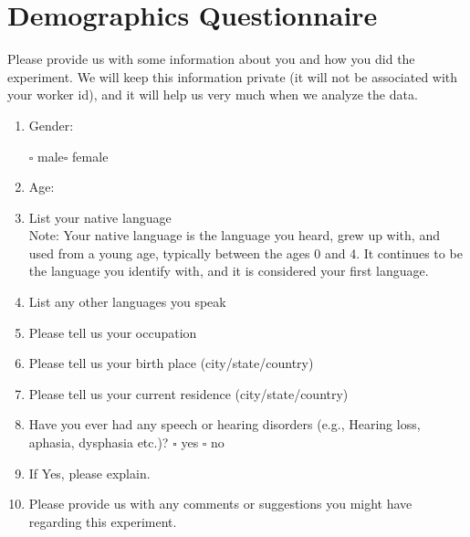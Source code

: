 
\section{Demographics Questionnaire}

Please provide us with some information about you and how you did the experiment. We will keep this information private (it will not be associated with your worker id), and it will help us very much when we analyze the data.
\begin{enumerate}

\item Gender: 

		$\square$ male\quad $\square$ female

\item Age: \underline{\hspace{3cm}}
\item List your native language \underline{\hspace{3cm}}\\
Note: Your native language is the language you heard, grew up with, and used from a young age, typically between the ages 0 and 4. It continues to be the language you identify with, and it is considered your first language. 
\item List any other languages you speak \underline{\hspace{3cm}}
\item Please tell us your occupation \underline{\hspace{3cm}}
\item Please tell us your birth place (city/state/country) \underline{\hspace{3cm}}
\item Please tell us your current residence (city/state/country) \underline{\hspace{3cm}}
\item	Have you ever had any speech or hearing disorders (e.g., Hearing loss, aphasia, dysphasia etc.)? 
		$\square$ yes \quad $\square$ no

\item If Yes, please explain. \\
\underline{\hspace{3cm}}
\item Please provide us with any comments or suggestions you might have regarding this experiment.\\
\underline{\hspace{3cm}}
\end{enumerate}


